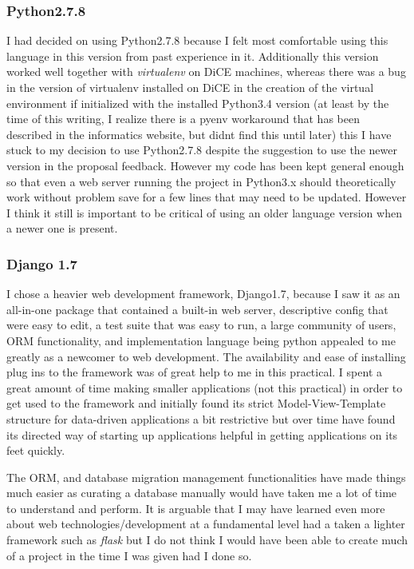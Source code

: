 \documentclass[11pt,a4paper]{article}
\begin{document}
\subsubsection{Python2.7.8}
I had decided on using Python2.7.8 because I felt most comfortable using this language in this version from past experience in it. Additionally this version worked well together with \textit{virtualenv} on DiCE machines, whereas there was a bug in the version of virtualenv installed on DiCE in the creation of the virtual environment if initialized with the installed Python3.4 version (at least by the time of this writing, I realize there is a pyenv workaround that has been described in the informatics website, but didnt find this until later) this I have stuck to my decision to use Python2.7.8 despite the suggestion to use the newer version in the proposal feedback. However my code has been kept general enough so that even a web server running the project in Python3.x should theoretically work without problem save for a few lines that may need to be updated. However I think it still is important to be critical of using an older language version when a newer one is present.

\subsubsection{Django 1.7}
I chose a heavier web development framework, Django1.7, because I saw it as an all-in-one package that contained a built-in web server, descriptive config that were easy to edit, a test suite that was easy to run, a large community of users, ORM functionality, and implementation language being python appealed to me greatly as a newcomer to web development. The availability and ease of installing plug ins to the framework was of great help to me in this practical. I spent a great amount of time making smaller applications (not this practical) in order to get used to the framework and initially found its strict Model-View-Template structure for data-driven applications a bit restrictive but over time have found its directed way of starting up applications helpful in getting applications on its feet quickly.

The ORM, and database migration management functionalities have made things much easier as curating a database manually would have taken me a lot of time to understand and perform. It is arguable that I may have learned even more about web technologies/development at a fundamental level had a taken a lighter framework such as \textit{flask} but I do not think I would have been able to create much of a project in the time I was given had I done so.
\end{document}
